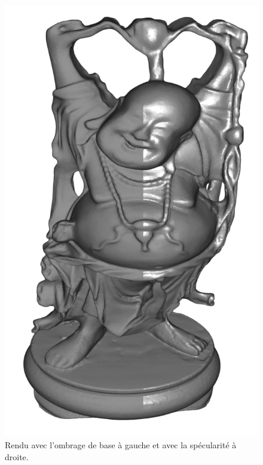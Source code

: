 \begin{figure}[h!]
	\centering
	\includegraphics[scale=0.23]{images/rendu_specular.png}
	\caption{\label{fig:screenSpecular.png} Rendu avec l'ombrage de base à gauche et avec la spécularité à droite. \protect}
\end{figure}

